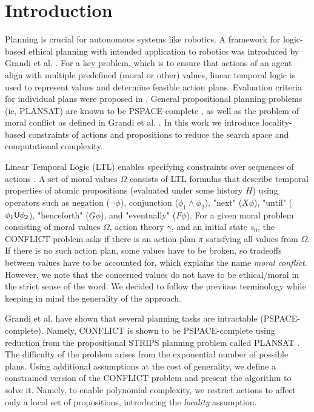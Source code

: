 \documentclass[]{jair}
\begin{document}
\section{Introduction}

Planning is crucial for autonomous systems like robotics. A framework for logic-based ethical planning with intended application to robotics was introduced by Grandi et al. \cite{grandi2022logic}. For a key problem, which is to ensure that actions of an agent align with multiple predefined (moral or other) values, linear temporal logic is used to represent values and determine feasible action plans. Evaluation criteria for individual plans were proposed in \cite{grandi2023moral}. General propositional planning problems (ie, PLANSAT) are known to be PSPACE-complete \cite{BYLANDER1994165}, as well as the problem of moral conflict as defined in Grandi et al. \cite{grandi2022logic}. In this work we introduce locality-based constraints of actions and propositions to reduce the search space and computational complexity. 

Linear Temporal Logic (LTL) enables specifying constraints over sequences of actions \cite{10.5555/975331}.
A set of moral values $\Omega$ consists of LTL formulas \cite{4567924} that describe temporal properties of atomic propositions (evaluated under some history $H$) using operators such as negation ($\neg \phi$), conjunction ($\phi_1\land \phi_2$), "next" ($X\phi$), "until" ($\phi_1 \sf{U} \phi_2$), "henceforth" ($G\phi$), and "eventually" ($F\phi$). For a given moral problem consisting of moral values $\Omega$, action theory $\gamma$, and an initial state $s_0$, the CONFLICT problem asks if there is an action plan $\pi$ satisfying all values from $\Omega$. If there is no such action plan, some values have to be broken, so tradeoffs between values have to be accounted for, which explains the name {\it moral conflict}. However, we note that the concerned values do not have to be ethical/moral in the strict sense of the word. We decided to follow the previous terminology while keeping in mind the generality of the approach.


Grandi et al. \cite{grandi2022logic} have shown that several planning tasks are intractable (PSPACE-complete). Namely, CONFLICT is shown to be PSPACE-complete using reduction from the propositional STRIPS planning problem called PLANSAT \cite{BYLANDER1994165}. The difficulty of the problem arises from the exponential number of possible plans.
Using additional assumptions at the cost of generality, we define a constrained version of the CONFLICT problem and present the algorithm to solve it. Namely, to enable polynomial complexity, we restrict actions to affect only a local set of propositions, introducing the {\it locality} assumption. 
\end{document}
